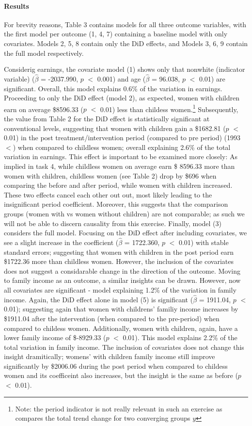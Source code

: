\documentclass[a4paper]{article}
\begin{document}
\paragraph{Results} For brevity reasons, Table 3 contains models for all three outcome variables, with the first model per outcome (1, 4, 7) containing a baseline model with only covariates. Models 2, 5, 8 contain only the DiD effects, and Models 3, 6, 9 contain the full model respectively. 

\indent Considerig earnings, the covariate model (1) shows only that nonwhite (indicator variable) ($\hat{\beta}$ = -2037.990, $p$ $<$ 0.001) and age ($\hat{\beta}$ = 96.038, $p$ $<$ 0.01) are significant. Overall, this model explains 0.6\% of the variation in earnings. Proceeding to only the DiD effect (model 2), as expected, women with children earn on average \$8596.33 ($p$ $<$ 0.01) less than childess women.\footnote{Note: the period indicator is not really relevant in such an exercise as compares the total trend change for two converging groups $y$} Subsequently, the value from Table 2 for the DiD effect is statistically significant at conventional levels, suggesting that women with children gain a \$1682.81 ($p$ $<$ 0.01) in the post treatment/intervention period (compared to pre period) (1993 $<$) when compared to childless women; overall explaining 2.6\% of the total variation in earnings. This effect is important to be examined more closely: As implied in task 4, while childless women on average earn \$ 8596.33 more than women with children, childless women (see Table 2) drop by \$696 when comparing the before and after period, while women with children increased. These two effects cancel each other out out, most likely leading to the insignificant period coefficient. Moreover, this suggests that the comparison groups (women with vs women without children) are not comparable; as such we will not be able to discern causality from this exercise. Finally, model (3) considers the full model. Focusing on the DiD effect after including covariates, we see a slight increase in the coefficient ($\hat{\beta}$ = 1722.360, $p$ $<$ 0.01) with stable standard errors; suggesting that women with children in the post period earn \$1722.36 more than childless women. However, the inclusion of the covariates does not suggest a considarable change in the direction of the outcome. 
\indent Moving to family income as an outcome, a similar insights can be drawn. However, now all covariates are significant - model explaining 1.2\% of the variation in family income. Again, the DiD effect alone in model (5) is significant ($\hat{\beta}$ = 1911.04, $p$ $<$ 0.01); suggesting again that women with childrens' familiy income increases by \$1911.04 after the intervention (when compared to the pre-period) when compared to childess women. Additionally, women with children, again, have a lower family income of \$-8929.33 ($p$ $<$ 0.01). This model explains 2.2\% of the total variation in family income. The inclusion of covariates does not change this insight dramitically; womens' with children family income still improve significantly by \$2006.06 during the post period when compared to childess women and its coefficeint also increases, but the insight is the same as before ($p$ $<$ 0.01). 
\end{document}
